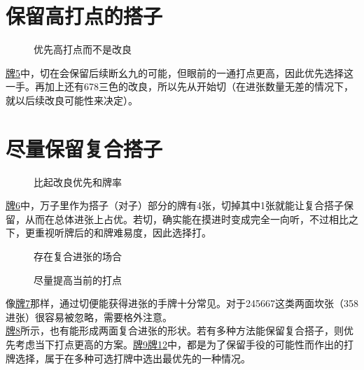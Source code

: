 \section{保留高打点的搭子}
\begin{figure}[h]
    \caption{优先高打点而不是改良}
    \label{lec6:pai5}
\end{figure}
\hyperref[lec6:pai5]{牌5}中，切在会保留后续断幺九的可能，但眼前的一通打点更高，因此优先选择这一手。再加上还有678三色的改良，所以先从开始切（在进张数量无差的情况下，就以后续改良可能性来决定）。

\section{尽量保留复合搭子}
\begin{figure}[h]
    \caption{比起改良优先和牌率}
    \label{lec6:pai6}
\end{figure}
\hyperref[lec6:pai6]{牌6}中，万子里作为搭子（对子）部分的牌有4张，切掉其中1张就能让复合搭子保留，从而在总体进张上占优。若切，确实能在摸进时变成完全一向听，不过相比之下，更重视听牌后的和牌难易度，因此选择打。

\begin{figure}[h]
    \caption{存在复合进张的场合}
    \label{lec6:pai7-8}
    \par\bigskip
\end{figure}
\begin{figure}
    \caption{尽量提高当前的打点}
    \label{lec6:pai9-12}
    \par\bigskip
    \par\bigskip
    \par\bigskip
\end{figure}

像\hyperref[lec6:pai7-8]{牌7}那样，通过切便能获得进张的手牌十分常见。对于245667这类两面坎张（358进张）很容易被忽略，需要格外注意。\\
\hyperref[lec6:pai7-8]{牌8}所示，也有能形成两面复合进张的形状。若有多种方法能保留复合搭子，则优先考虑当下打点更高的方案。\hyperref[lec6:pai9-12]{牌9}\hyperref[lec6:pai9-12]{牌12}中，都是为了保留手役的可能性而作出的打牌选择，属于在多种可选打牌中选出最优先的一种情况。

